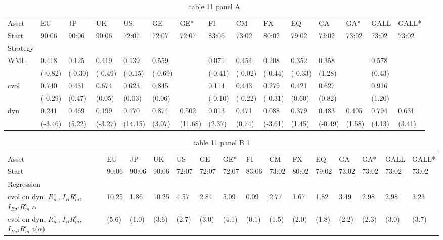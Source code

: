 \documentclass{article}
\begin{document}
\begin{table}[htbp]
  \centering
  \caption{table 11 panel A}
  \label{tab:table_11_panel_A}
  \begin{tabular}{lllllllllllllll}
\toprule
Asset & EU & JP & UK & US & GE & GE* & FI & CM & FX & EQ & GA & GA* & GALL & GALL* \\
Start & 90:06 & 90:06 & 90:06 & 72:07 & 72:07 & 72:07 & 83:06 & 73:02 & 80:02 & 79:02 & 73:02 & 73:02 & 73:02 & 73:02 \\
Strategy &  &  &  &  &  &  &  &  &  &  &  &  &  &  \\
\midrule
WML & 0.418 & 0.125 & 0.419 & 0.439 & 0.559 &  & 0.071 & 0.454 & 0.208 & 0.352 & 0.358 &  & 0.578 &  \\
 & (-0.82) & (-0.30) & (-0.49) & (-0.15) & (-0.69) &  & (-0.41) & (-0.02) & (-0.44) & (-0.33) & (1.28) &  & (0.43) &  \\
cvol & 0.740 & 0.431 & 0.674 & 0.623 & 0.845 &  & 0.114 & 0.443 & 0.279 & 0.421 & 0.627 &  & 0.916 &  \\
 & (-0.29) & (0.47) & (0.05) & (0.03) & (0.06) &  & (-0.10) & (-0.22) & (-0.31) & (0.60) & (0.82) &  & (1.20) &  \\
dyn & 0.241 & 0.469 & 0.199 & 0.470 & 0.874 & 0.502 & 0.013 & 0.471 & 0.088 & 0.379 & 0.483 & 0.405 & 0.794 & 0.631 \\
 & (-3.46) & (5.22) & (-3.27) & (14.15) & (3.07) & (11.68) & (2.37) & (0.74) & (-3.61) & (1.45) & (-0.49) & (1.58) & (4.13) & (3.41) \\
\bottomrule
\end{tabular}
\end{table}

\begin{table}[htbp]
  \centering
  \caption{table 11 panel B 1}
  \label{tab:table_11_panel_B_1}
  \begin{tabular}{lllllllllllllll}
\toprule
Asset & EU & JP & UK & US & GE & GE* & FI & CM & FX & EQ & GA & GA* & GALL & GALL* \\
Start & 90:06 & 90:06 & 90:06 & 72:07 & 72:07 & 72:07 & 83:06 & 73:02 & 80:02 & 79:02 & 73:02 & 73:02 & 73:02 & 73:02 \\
Regression &  &  &  &  &  &  &  &  &  &  &  &  &  &  \\
\midrule
cvol on dyn, $R^e_m$, $I_B R^e_m$, $I_{B\sigma^2} R^e_m$ $\alpha$ & 10.25 & 1.86 & 10.25 & 4.57 & 2.84 & 5.09 & 0.09 & 2.77 & 1.67 & 1.82 & 3.49 & 2.98 & 2.98 & 3.23 \\
cvol on dyn, $R^e_m$, $I_B R^e_m$, $I_{B\sigma^2} R^e_m$ t($\alpha$) & (5.6) & (1.0) & (3.6) & (2.7) & (3.0) & (4.1) & (0.1) & (1.5) & (2.0) & (1.8) & (2.2) & (2.3) & (3.0) & (3.7) \\
\bottomrule
\end{tabular}
\end{table}
\end{document}
